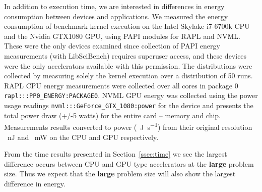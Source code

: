 \documentclass[../document.tex]{subfiles}
\begin{document}
\label{ssec:energy}
	
In addition to execution time, we are interested in differences in energy consumption between devices and applications.
We measured the energy consumption of benchmark kernel execution on the Intel Skylake i7-6700k CPU and the Nvidia GTX1080 GPU, using PAPI modules for RAPL and NVML. 
These were the only devices examined since collection of PAPI energy measurements (with LibSciBench) requires superuser access, and these devices were the only accelerators available with this permission.
The distributions were collected by measuring solely the kernel execution over a distribution of 50 runs.
RAPL CPU energy measurements were collected over all cores in package 0 {\tt rapl:::PP0\_ENERGY:PACKAGE0}.
NVML GPU energy was collected using the power usage readings {\tt nvml:::GeForce\_GTX\_1080:power} for the device and presents the total power draw (+/-5 watts) for the entire card -- memory and chip.
Measurements results converted to power (\SI{}{\joule\per\second}) from their original resolution \SI{}{\nano\joule} and \SI{}{\milli\watt} on the CPU and GPU respectively.

From the time results presented in Section~\ref{ssec:time} we see the largest difference occurs between CPU and GPU type accelerators at the {\bf large} problem size.
Thus we expect that the {\bf large} problem size will also show the largest difference in energy.
\end{document}
